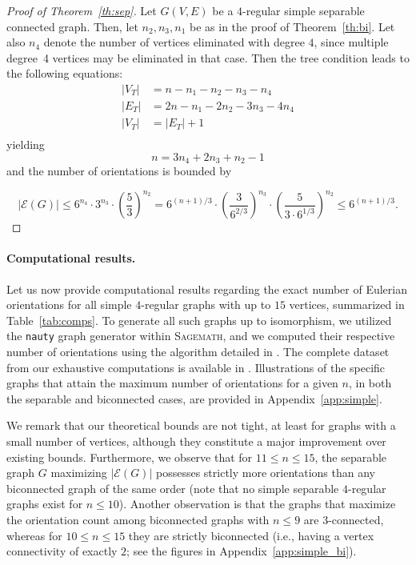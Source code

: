 \documentclass{article}
\begin{document}
        \begin{proof}[Proof of Theorem~\ref{th:sep}]
            Let $G(V,E)$ be a $4$-regular simple separable connected graph.
            Then, let $n_2, n_3, n_1$ be as in the proof of Theorem~\ref{th:bi}.
            Let also $n_4$ denote the number of vertices eliminated with degree $4$, since multiple degree~4 vertices may be eliminated in that case.
            Then the tree condition leads to the following equations:
            \begin{align*}
              |V_T| &= n-n_1-n_2-n_3-n_4 \\
              |E_T| &= 2n-n_1-2n_2-3n_3-4n_4\\
              |V_T| & = |E_T|+1 \\
            \end{align*}
            yielding
            $$ n=3n_4+2n_3+n_2-1$$
            and the number of orientations is bounded by 
            
            \begin{equation}\label{eq:final_simple}
                |\mathcal{E}(G)| \leq 6^{n_4}\cdot  3^{n_3}\cdot \left( \frac{5}{3}\right)^{n_2} = 
                6^{(n+1)/3}\cdot \left(\frac{3}{6^{2/3}}\right)^{n_3}\cdot \left(\frac{5}{3\cdot 6^{1/3}}\right)^{n_2} \leq 6^{(n+1)/3}.
            \end{equation}
        \end{proof}

        \paragraph{Computational results.}
        Let us now provide computational results regarding the exact number of Eulerian orientations for all simple $4$-regular graphs with up to $15$ vertices, summarized in Table~\ref{tab:comps}.
        To generate all such graphs up to isomorphism, we utilized the \texttt{nauty} graph generator \cite{nauty} within \textsc{Sagemath}, and we computed their respective number of orientations using the algorithm detailed in \cite{code_mBezout}.
        The complete dataset from our exhaustive computations is available in \cite{dataforpaper}.
        Illustrations of the specific graphs that attain the maximum number of orientations for a given $n$, in both the separable and biconnected cases, are provided in Appendix~\ref{app:simple}.
        
        We remark that our theoretical bounds are not tight, at least for graphs with a small number of vertices, although they constitute a major improvement over existing bounds.
        Furthermore, we observe that for $11 \leq n \leq 15$, the separable graph $G$ maximizing $|\mathcal{E}(G)|$ possesses strictly more orientations than any biconnected graph of the same order (note that no simple separable $4$-regular graphs exist for $n \leq 10$).
        Another observation is that the graphs that maximize the orientation count among biconnected graphs with $n\leq 9$ are $3$-connected, whereas for $10 \leq n \leq 15$ they are strictly biconnected (i.e., having a vertex connectivity of exactly $2$; see the figures in Appendix~\ref{app:simple_bi}).
\end{document}
